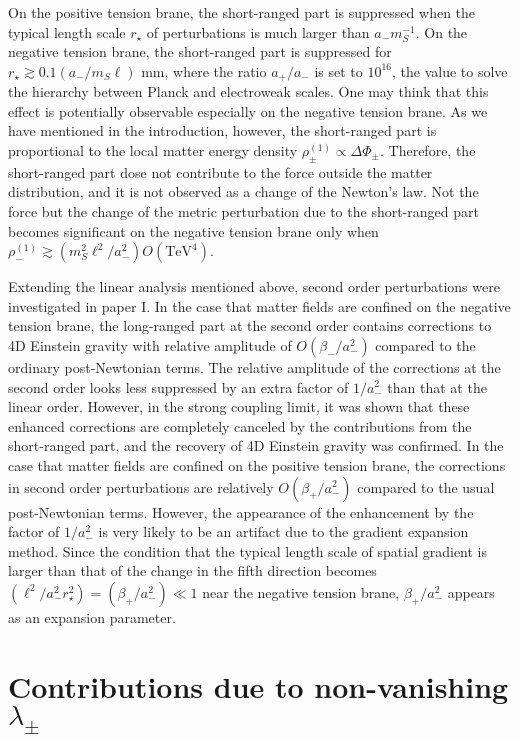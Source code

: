 \documentclass[a4paper,showpacs,preprintnumbers,amsmath,amssymb]{revtex4}
\begin{document}
On the positive tension brane, the short-ranged part is suppressed when the typical length scale $r_\star$ of perturbations is much larger than
$a_{-} m_S^{-1} $. 
On the negative tension brane, the short-ranged part is suppressed for $r_\star \gtrsim  0.1 (a_-/m_S\ell)$ mm, where the ratio $a_+/a_-$ is set to $10^{16}$, the value to solve the hierarchy between Planck and electroweak scales. 
One may think that this effect is potentially observable especially on the negative tension brane. 
As we have mentioned in the introduction, however, the short-ranged part is proportional to the local matter energy density $\rho_\pm^{(1)} \propto \Delta \Phi_\pm$. Therefore, the short-ranged part dose not contribute to the force outside the matter distribution, and it is not observed as a change of the Newton's law. 
Not the force but the change of the metric perturbation due to the short-ranged part becomes significant on the negative tension brane only when $\rho^{(1)}_- \gtrsim (m_S^2\ell^2/a_-^2) O (\textrm{TeV}^4)$.


Extending the linear analysis mentioned above, second order perturbations were investigated in paper I.  In the case that matter fields are confined on the negative tension brane, the long-ranged part at the second order contains corrections to 4D Einstein gravity with relative amplitude of $O(\beta_-/a_-^2)$ compared to the ordinary post-Newtonian terms.
The relative amplitude of the corrections at the second order looks less suppressed by an extra factor of $1/a_-^{2}$ than that at the linear order.
However, in the strong coupling limit, it was shown that these enhanced corrections are completely canceled by the contributions from the short-ranged part, and the recovery of 4D Einstein gravity was confirmed. 
In the case that matter fields are confined on the positive tension brane, the corrections in second order perturbations are relatively $O(\beta_+/a_-^{2})$ compared to the usual post-Newtonian terms.  
However, the appearance of the enhancement by the factor of $1/a_-^2$ is very likely to be an artifact due to the gradient expansion method. Since the condition that the typical length scale of spatial gradient is larger than that of the change in the fifth direction becomes $(\ell^2/a^2_- r_\star^2) = (\beta_+/a^2_-)\ll 1$ near the negative tension brane, $\beta_+/a^2_-$ appears as an expansion parameter. 
 

 
\section{Contributions due to non-vanishing $\lambda_\pm$}
\label{sec:finite coupling}
\end{document}
